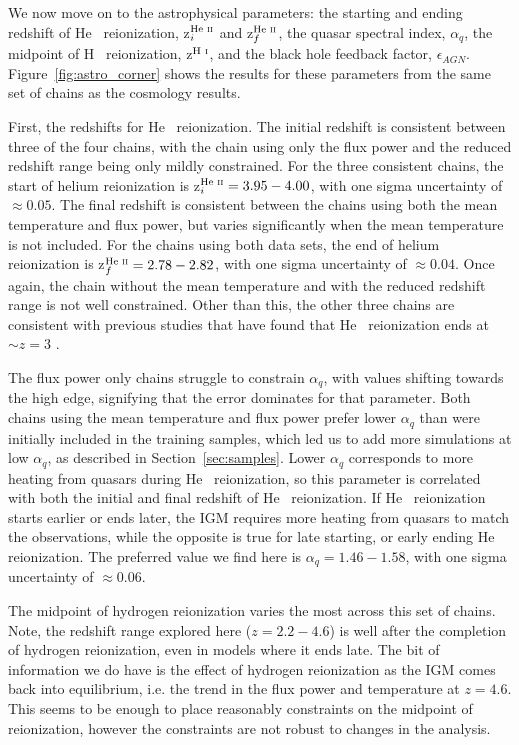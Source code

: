\documentclass[a4paper,11pt]{article}
\begin{document}
We now move on to the astrophysical parameters: the starting and ending redshift of He~{} reionization, z$^{\text{He~{\sc ii}}}_i$ and z$^{\text{He~{\sc ii}}}_f$, the quasar spectral index, $\alpha_q$, the midpoint of H~{} reionization, z$^{\text{H~{\sc i}}}$, and the black hole feedback factor, $\epsilon_{AGN}$.
Figure~\ref{fig:astro_corner} shows the results for these parameters from the same set of chains as the cosmology results.

First, the redshifts for He~{} reionization.
The initial redshift is consistent between three of the four chains, with the chain using only the flux power and the reduced redshift range being only mildly constrained.
For the three consistent chains, the start of helium reionization is z$^{\text{He~{\sc ii}}}_i = 3.95-4.00$, with one sigma uncertainty of $\approx0.05$.
The final redshift is consistent between the chains using both the mean temperature and flux power, but varies significantly when the mean temperature is not included.
For the chains using both data sets, the end of helium reionization is z$^{\text{He~{\sc ii}}}_f = 2.78-2.82$, with one sigma uncertainty of $\approx0.04$.
Once again, the chain without the mean temperature and with the reduced redshift range is not well constrained.
Other than this, the other three chains are consistent with previous studies that have found that He~{} reionization ends at $\sim z=3$ \cite{2009ApJ...704L..89M, 2011ApJ...733L..24W, 2019ApJ...875..111W}.

The flux power only chains struggle to constrain $\alpha_q$, with values shifting towards the high edge, signifying that the error dominates for that parameter.
Both chains using the mean temperature and flux power prefer lower $\alpha_q$ than were initially included in the training samples, which led us to add more simulations at low $\alpha_q$, as described in Section~\ref{sec:samples}.
Lower $\alpha_q$ corresponds to more heating from quasars during He~{} reionization, so this parameter is correlated with both the initial and final redshift of He~{} reionization.
If He~{} reionization starts earlier or ends later, the IGM requires more heating from quasars to match the observations, while the opposite is true for late starting, or early ending He~{} reionization.
The preferred value we find here is $\alpha_q = 1.46-1.58$, with one sigma uncertainty of $\approx0.06$.

The midpoint of hydrogen reionization varies the most across this set of chains.
Note, the redshift range explored here ($z=2.2-4.6$) is well after the completion of hydrogen reionization, even in models where it ends late.
The bit of information we do have is the effect of hydrogen reionization as the IGM comes back into equilibrium, i.e. the trend in the flux power and temperature at $z=4.6$.
This seems to be enough to place reasonably constraints on the midpoint of reionization, however the constraints are not robust to changes in the analysis.
\end{document}
